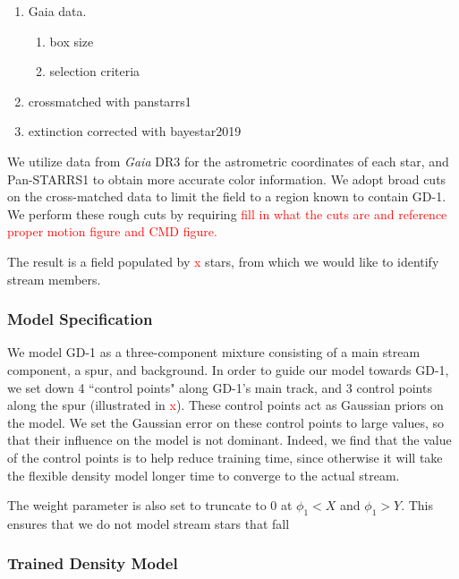 \documentclass[twocolumn]{aastex631}
\newcommand{\TODO}[1]{{\textcolor{red}{#1}}}
\newcommand{\JN}[1]{\TODO{#1}}
\begin{document}
            \begin{enumerate}
                \item Gaia data.
                    \begin{enumerate}
                        \item box size
                        \item selection criteria
                    \end{enumerate}
                \item crossmatched with panstarrs1
                \item extinction corrected with bayestar2019
            \end{enumerate}

            We utilize data from {\it Gaia} DR3 for the astrometric coordinates of each star, and Pan-STARRS1 to obtain more accurate color information. We adopt broad cuts on the cross-matched data to limit the field to a region known to contain GD-1. We perform these rough cuts by requiring \JN{fill in what the cuts are and reference proper motion figure and CMD figure.} 

            The result is a field populated by \JN{x} stars, from which we would like to identify stream members.

        \subsubsection{Model Specification}\label{sec:GD_1_ModelSpecification}
    
            We model GD-1 as a three-component mixture consisting of a main stream component, a spur, and background. In order to guide our model towards GD-1, we set down 4 ``control points" along GD-1's main track, and 3 control points along the spur (illustrated in \JN{x}). These control points act as Gaussian priors on the model. We set the Gaussian error on these control points to large values, so that their influence on the model is not dominant. Indeed, we find that the value of the control points is to help reduce training time, since otherwise it will take the flexible density model longer time to converge to the actual stream.
    
            The weight parameter is also set to truncate to $0$ at $\phi_1 < X$ and $\phi_1 > Y$. This ensures that we do not model stream stars that fall 
        
        
        \subsubsection{Trained Density Model}\label{ssub:trained_gd1}
    
\end{document}
